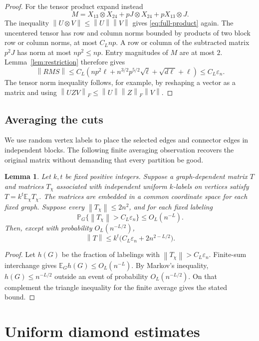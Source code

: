 \documentclass[11pt]{article}
\newtheorem{lemma}[theorem]{Lemma}
\theoremstyle{remark}
\newcommand{\E}{\mathbb E}
\newcommand{\Prob}{\mathbb P}
\newcommand{\norm}[1]{\left\lVert#1\right\rVert}
\begin{document}
\begin{proof}
For the tensor product expand instead
\[
 M=X_{13}\otimes X_{24}+pJ\otimes X_{24}+pX_{13}\otimes J.
\]
The inequality $\norm{U\otimes V}\leq\norm U\norm V$ gives
\eqref{eq:full-product} again. The uncentered tensor has row and column
norms bounded by products of two block row or column norms, at most
$C_Lnp$. A row or column of the subtracted matrix $p^2J$ has norm
at most $np^2\leq np$. Entry magnitudes of $M$ are at most $2$.
Lemma~\ref{lem:restriction} therefore gives
\[
 \norm{RMS}\leq C_L\left(
 np^2\ell+n^{3/2}p^{5/2}\sqrt\ell+\sqrt{d\ell}+\ell\right)
 \leq C_L\varepsilon_n.
\]
The tensor norm inequality follows, for example, by reshaping a vector
as a matrix and using $\norm{UZV}_F\leq\norm U\norm Z_F\norm V$.
\end{proof}

\subsection{Averaging the cuts}

We use random vertex labels to place the selected edges and connector edges
in independent blocks. The following finite averaging observation recovers
the original matrix without demanding that every partition be good.

\begin{lemma}\label{lem:averaging}
Let $k,t$ be fixed positive integers. Suppose a graph-dependent matrix $T$
and matrices $T_\chi$ associated with independent uniform $k$-labels on
vertices satisfy $T=k^t\E_\chi T_\chi$. The matrices are embedded in a
common coordinate space for each fixed graph. Suppose every
$\norm{T_\chi}\leq2n^2$, and for each fixed labeling
\[
 \Prob_G\{\norm{T_\chi}>C_L\varepsilon_n\}\leq O_L(n^{-L}).
\]
Then, except with probability $O_L(n^{-L/2})$,
\[
 \norm T\leq k^t\bigl(C_L\varepsilon_n+2n^{2-L/2}\bigr).
\]
\end{lemma}
\begin{proof}
Let $h(G)$ be the fraction of labelings with
$\norm{T_\chi}>C_L\varepsilon_n$. Finite-sum interchange gives
$\E_G h(G)\leq O_L(n^{-L})$.
By Markov's inequality, $h(G)\leq n^{-L/2}$ outside an event of
probability $O_L(n^{-L/2})$. On that complement the triangle inequality
for the finite average gives the stated bound.
\end{proof}

\section{Uniform diamond estimates}
\end{document}
